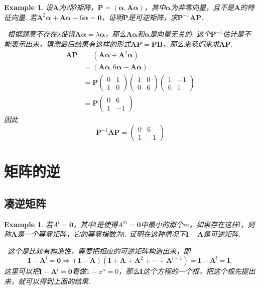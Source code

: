 \documentclass{article}
\newtheorem{example}[theorem]{Example}
\newcommand{\hints}{{\color{blue} \text{hints}}}
\newcommand{\mbf}[1]{\bm{#1}}
\begin{document}
\begin{example}
\rm 设$\mbf{A}$为2阶矩阵，$\mbf{P}=(\mbf{\alpha},\mbf{A\alpha})$，其中$\mbf{\alpha}$为非零向量，且不是$\mbf{A}$的特征向量. 若$\mbf{A}^2\mbf{\alpha}+\mbf{A\alpha}-6\mbf{\alpha} = \mbf{0}$，证明$\mbf{P}$是可逆矩阵，求$\mbf{P}^{-1}\mbf{A}\mbf{P}$. 

\hints\ 根据题意不存在$\lambda$使得$\mbf{A\alpha} = \lambda\mbf{\alpha}$，那么$\mbf{A\alpha}$和$\mbf{\alpha}$是向量无关的. 这个$\mbf{P}^{-1}$估计是不能表示出来，猜测最后结果有这样的形式$\mbf{AP} = \mbf{P}\mbf{B}$，那么来我们来求$\mbf{AP}$.
$$
\begin{aligned}
\mbf{AP} &= (\mbf{A\alpha} + \mbf{A}^2\mbf{\alpha})  \\
&=(\mbf{A\alpha},6\mbf{\alpha}-\mbf{A\alpha}) \\
&=\mbf{P}\begin{pmatrix}
0 & 1 \\
1 & 0
\end{pmatrix}\begin{pmatrix}
1 & 0 \\
0 & 6
\end{pmatrix}
\begin{pmatrix}
1 & -1 \\
0 & 1
\end{pmatrix} \\
& = \mbf{P}\begin{pmatrix}
0 & 6 \\
1 & -1
\end{pmatrix}
\end{aligned}
$$
因此
$$
\mbf{P}^{-1}\mbf{A}\mbf{P} = \begin{pmatrix}
0 & 6 \\
1 & -1
\end{pmatrix}
$$
\end{example}

\newpage
\section{矩阵的逆}

\subsection{凑逆矩阵}

\begin{example}
\rm 若$A^l = \mbf{0}$，其中$l$是使得$A^m = \mbf{0}$中最小的那个$m$，如果存在这样$l$，则称$\mbf{A}$是一个幂零矩阵，它的幂零指数为$l$. 证明在这种情况下$\mbf{I}-\mbf{A}$是可逆矩阵.

\hints\ 这个是比较有构造性，需要把相应的可逆矩阵构造出来，即
$$
\mbf{I} - \mbf{A}^l = \mbf{0} \Rightarrow (\mbf{I}-\mbf{A})(\mbf{I} + \mbf{A} + \mbf{A}^2 +\cdots + \mbf{A}^{l-1}) = \mbf{I} - \mbf{A}^l = \mbf{I},
$$  
这里可以把$\mbf{I} - \mbf{A}^l = \mbf{0}$看做$1-x^n = 0$，那么$\mbf{I}$这个方程的一个根，把这个根先提出来，就可以得到上面的结果.
\end{example}
\end{document}
